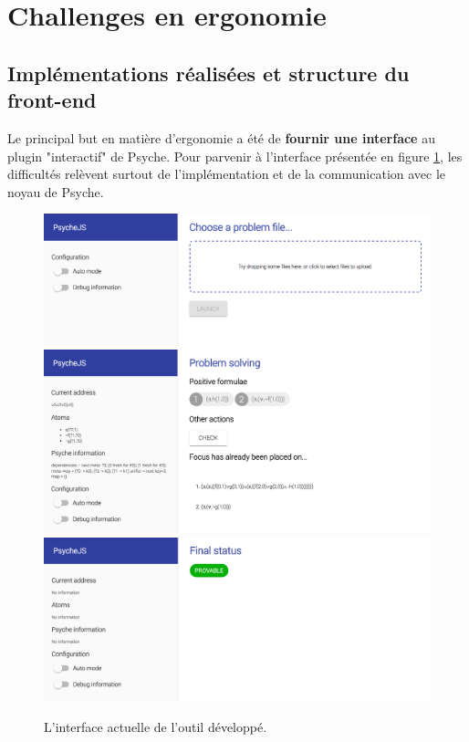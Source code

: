\section{Challenges en ergonomie}

\subsection{Implémentations réalisées et structure du front-end}

Le principal but en matière d'ergonomie a été de \textbf{fournir une interface} au plugin "interactif" de Psyche. Pour parvenir à l'interface présentée en figure \ref{interface_global}, les difficultés relèvent surtout de l'implémentation et de la communication avec le noyau de Psyche.

\begin{figure}[!ht]
    \center
    \includegraphics[width=1\textwidth]{./images/III_1_interface_1.png}
    \includegraphics[width=1\textwidth]{./images/III_1_interface_2.png}
    \includegraphics[width=1\textwidth]{./images/III_1_interface_3.png}
    \caption{\label{interface_global} L'interface actuelle de l'outil développé.}
\end{figure}

